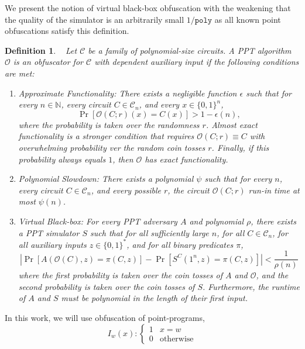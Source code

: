 \documentclass[11pt]{article}
\newcommand{\zo}{\ensuremath{\{0, 1\}}}
\newcommand{\poly}{\ensuremath{\mathtt{poly}}\xspace}
\newtheorem{definition}[theorem]{Definition}
\begin{document}
We present the notion of virtual black-box obfuscation with the weakening that the quality of the simulator is an arbitrarily small $1/\poly$ as all known point obfuscations satisfy this definition.

\begin{definition}~\cite{barak2001possibility, goldwasser2005impossibility}  Let $\mathcal{C}$ be a family of polynomial-size circuits.  A PPT algorithm $\mathcal{O}$ is an obfuscator for $\mathcal{C}$ with dependent auxiliary input if the following conditions are met:
\begin{enumerate}
\item \emph{Approximate Functionality:}  There exists a negligible function $\epsilon$ such that for every $n\in \mathbb{N}$, every circuit $C\in \mathcal{C}_n$, and every $x\in\zo^n$, 
\[
\Pr[\mathcal{O}(C; r)(x) = C(x)] > 1-\epsilon(n),
\]
where the probability is taken over the randomness $r$.  \emph{Almost exact functionality} is a stronger condition that requires $\mathcal{O}(C;r)\equiv C$ with overwhelming probability ver the random coin tosses $r$.  Finally, if this probability always equals $1$, then $\mathcal{O}$ has \emph{exact functionality}.
\item \emph{Polynomial Slowdown:}  There exists a polynomial $\psi$ such that for every $n$, every circuit $C\in \mathcal{C}_n$, and every possible $r$, the circuit $\mathcal{O}(C; r)$ run-in time at most $\psi(n)$.
\item \emph{Virtual Black-box:}  For every PPT adversary $A$ and polynomial $\rho$, there exists a PPT simulator $S$ such that for all sufficiently large $n$, for all $C\in \mathcal{C}_n$, for all auxiliary inputs $z\in \zo^*$, 
and for all binary predicates $\pi$, 
\[
|\Pr[A(\mathcal{O}(C), z) = \pi(C, z)] - \Pr[S^C(1^n, z) = \pi(C, z)] | < \frac{1}{\rho(n)}
\]
where the first probability is taken over the coin tosses of $A$ and $\mathcal{O}$, and the second probability is taken over the coin tosses of $S$.  Furthermore, the runtime of $A$ and $S$ must be polynomial in the length of their first input.
\end{enumerate}
\end{definition}

In this work, we will use obfuscation of point-programs, 
\[
I_w(x):\begin{cases} 1 & x=w\\0 & \text{otherwise}\end{cases}
\]
\end{document}
